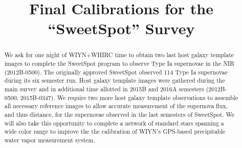 \documentclass[11pt]{article}
\begin{document}
%
%

\title{Final Calibrations for the ``SweetSpot'' Survey}



%


\begin{abstract}

We ask for one night of WIYN+WHIRC time to obtain two last host galaxy template images
to complete the SweetSpot program to observe Type Ia supernovae in the NIR (2012B-0500).
The originally approved SweetSpot observed 114 Type Ia supernovae during its six semester run. 
Host galaxy template images were gathered during the main survey and in additional time allotted in 2015B and 2016A semesters (2012B-0500, 2015B-0347). 
We require two more host galaxy template observations to assemble all necessary reference images to allow accurate measurement of the supernova flux, and thus distance, for the supernovae observed in the last semesters of SweetSpot.
We will also take this opportunity to complete a network of standard stars spanning a wide color range
to improve the the calibration of WIYN's GPS-based precipitable water vapor measurement system. 

\end{abstract}

\end{document}
